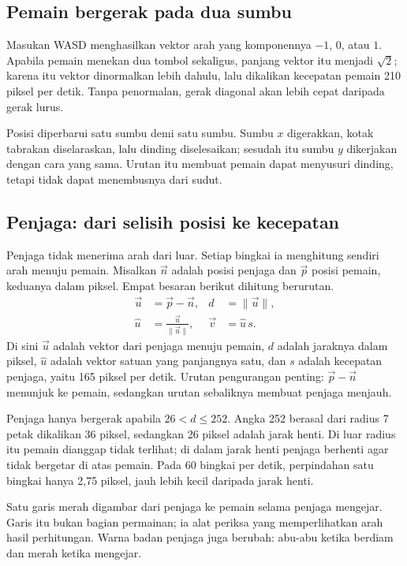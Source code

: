 \subsection*{Pemain bergerak pada dua sumbu}

Masukan WASD menghasilkan vektor arah yang komponennya $-1$, $0$, atau $1$.
Apabila pemain menekan dua tombol sekaligus, panjang vektor itu menjadi
$\sqrt{2}$; karena itu vektor dinormalkan lebih dahulu, lalu dikalikan kecepatan
pemain 210 piksel per detik. Tanpa penormalan, gerak diagonal akan lebih cepat
daripada gerak lurus.

Posisi diperbarui satu sumbu demi satu sumbu. Sumbu $x$ digerakkan, kotak
tabrakan diselaraskan, lalu dinding diselesaikan; sesudah itu sumbu $y$
dikerjakan dengan cara yang sama. Urutan itu membuat pemain dapat menyusuri
dinding, tetapi tidak dapat menembusnya dari sudut.

\subsection*{Penjaga: dari selisih posisi ke kecepatan}

Penjaga tidak menerima arah dari luar. Setiap bingkai ia menghitung sendiri
arah menuju pemain. Misalkan $\vec{n}$ adalah posisi penjaga dan $\vec{p}$
posisi pemain, keduanya dalam piksel. Empat besaran berikut dihitung berurutan.
\begin{align*}
  \vec{u} &= \vec{p} - \vec{n}, &
  d &= \lVert \vec{u} \rVert, \\
  \hat{u} &= \frac{\vec{u}}{\lVert \vec{u} \rVert}, &
  \vec{v} &= \hat{u}\,s .
\end{align*}
Di sini $\vec{u}$ adalah vektor dari penjaga menuju pemain, $d$ adalah jaraknya
dalam piksel, $\hat{u}$ adalah vektor satuan yang panjangnya satu, dan $s$
adalah kecepatan penjaga, yaitu 165 piksel per detik. Urutan pengurangan penting:
$\vec{p} - \vec{n}$ menunjuk ke pemain, sedangkan urutan sebaliknya membuat
penjaga menjauh.

Penjaga hanya bergerak apabila $26 < d \le 252$. Angka 252 berasal dari radius
7 petak dikalikan 36 piksel, sedangkan 26 piksel adalah jarak henti. Di luar
radius itu pemain dianggap tidak terlihat; di dalam jarak henti penjaga berhenti
agar tidak bergetar di atas pemain. Pada 60 bingkai per detik, perpindahan satu
bingkai hanya 2,75 piksel, jauh lebih kecil daripada jarak henti.

Satu garis merah digambar dari penjaga ke pemain selama penjaga mengejar. Garis
itu bukan bagian permainan; ia alat periksa yang memperlihatkan arah hasil
perhitungan. Warna badan penjaga juga berubah: abu-abu ketika berdiam dan merah
ketika mengejar.

